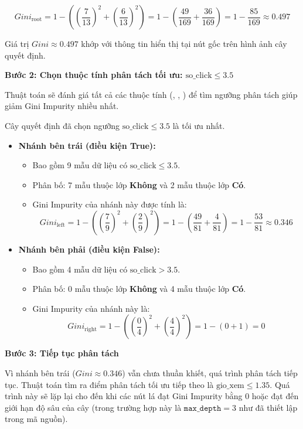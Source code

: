 \[
Gini_{\text{root}} = 1 - \left( \left(\frac{7}{13}\right)^2 + \left(\frac{6}{13}\right)^2 \right) = 1 - \left( \frac{49}{169} + \frac{36}{169} \right) = 1 - \frac{85}{169} \approx 0.497
\]

Giá trị $Gini \approx 0.497$ khớp với thông tin hiển thị tại nút gốc trên hình ảnh cây quyết định.

\textbf{Bước 2: Chọn thuộc tính phân tách tối ưu: $\text{so\_click} \leq 3.5$}

Thuật toán sẽ đánh giá tất cả các thuộc tính (, , ) để tìm ngưỡng phân tách giúp giảm Gini Impurity nhiều nhất.

Cây quyết định đã chọn ngưỡng $\text{so\_click} \leq 3.5$ là tối ưu nhất.

\begin{itemize}
    \item \textbf{Nhánh bên trái (điều kiện True):}
    \begin{itemize}
        \item Bao gồm 9 mẫu dữ liệu có $\text{so\_click} \leq 3.5$.
        \item Phân bố: 7 mẫu thuộc lớp \textbf{Không} và 2 mẫu thuộc lớp \textbf{Có}.
        \item Gini Impurity của nhánh này được tính là:
        \[
        Gini_{\text{left}} = 1 - \left( \left(\frac{7}{9}\right)^2 + \left(\frac{2}{9}\right)^2 \right) = 1 - \left( \frac{49}{81} + \frac{4}{81} \right) = 1 - \frac{53}{81} \approx 0.346
        \]
    \end{itemize}
    \item \textbf{Nhánh bên phải (điều kiện False):}
    \begin{itemize}
        \item Bao gồm 4 mẫu dữ liệu có $\text{so\_click} > 3.5$.
        \item Phân bố: 0 mẫu thuộc lớp \textbf{Không} và 4 mẫu thuộc lớp \textbf{Có}.
        \item Gini Impurity của nhánh này là:
        \[
        Gini_{\text{right}} = 1 - \left( \left(\frac{0}{4}\right)^2 + \left(\frac{4}{4}\right)^2 \right) = 1 - (0+1) = 0
        \]
    \end{itemize}
\end{itemize}

\textbf{Bước 3: Tiếp tục phân tách}

Vì nhánh bên trái ($Gini \approx 0.346$) vẫn chưa thuần khiết, quá trình phân tách tiếp tục. Thuật toán tìm ra điểm phân tách tối ưu tiếp theo là $\text{gio\_xem} \leq 1.35$. Quá trình này sẽ lặp lại cho đến khi các nút lá đạt Gini Impurity bằng 0 hoặc đạt đến giới hạn độ sâu của cây (trong trường hợp này là $\mathtt{max\_depth}=3$ như đã thiết lập trong mã nguồn).


